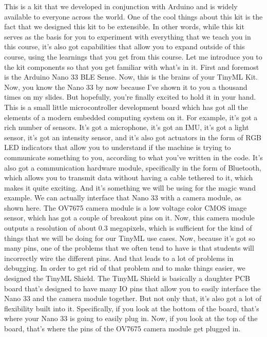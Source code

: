 This is a kit that we developed in conjunction with Arduino and is widely available to everyone across the world. One of the cool things about this kit is the fact that we designed this kit to be extensible.
In other words, while this kit serves as the basis for you to experiment with everything that we teach you in this course, it's also got capabilities that allow you to expand outside of this course, using the learnings that you get from this course.
Let me introduce you to the kit components so that you get familiar with what's in it.
First and foremost is the Arduino Nano 33 BLE Sense.
Now, this is the brains of your TinyML Kit.
Now, you know the Nano 33 by now because I've shown it to you a thousand times on my slides.
But hopefully, you're finally excited to hold it in your hand.
This is a small little microcontroller development board which has got all the elements of a modern embedded computing system on it.
For example, it's got a rich number of sensors.
It's got a microphone, it's got an IMU, it's got a light sensor, it's got an intensity sensor, and it's also got actuators in the form of RGB LED indicators that allow you to understand if the machine is trying to communicate something to you, according to what you've written in the code.
It's also got a communication hardware module, specifically in the form of Bluetooth, which allows you to transmit data without having a cable tethered to it, which makes it quite exciting.
And it's something we will be using for the magic wand example.
We can actually interface that Nano 33 with a camera module, as shown here.
The OV7675 camera module is a low voltage color CMOS image sensor, which has got a couple of breakout pins on it.
Now, this camera module outputs a resolution of about 0.3 megapixels, which is sufficient for the kind of things that we will be doing for our TinyML use cases.
Now, because it's got so many pins, one of the problems that we often tend to have is that students will incorrectly wire the different pins.
And that leads to a lot of problems in debugging.
In order to get rid of that problem and to make things easier, we designed the TinyML Shield.
The TinyML Shield is basically a daughter PCB board that's designed to have many IO pins that allow you to easily interface the Nano 33 and the camera module together.
But not only that, it's also got a lot of flexibility built into it.
Specifically, if you look at the bottom of the board, that's where your Nano 33 is going to easily plug in.
Now, if you look at the top of the board, that's where the pins of the OV7675 camera module get plugged in.
